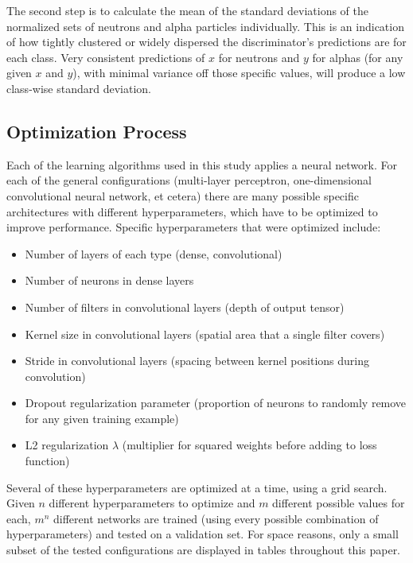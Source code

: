 \documentclass[10pt]{article}
\begin{document}
The second step is to calculate the mean of the standard deviations of the normalized sets of neutrons and alpha particles individually. This is an indication of how tightly clustered or widely dispersed the discriminator's predictions are for each class. Very consistent predictions of $x$ for neutrons and $y$ for alphas (for any given $x$ and $y$), with minimal variance off those specific values, will produce a low class-wise standard deviation.

\subsection{Optimization Process}

Each of the learning algorithms used in this study applies a neural network. For each of the general configurations (multi-layer perceptron, one-dimensional convolutional neural network, et cetera) there are many possible specific architectures with different hyperparameters, which have to be optimized to improve performance. Specific hyperparameters that were optimized include:

\begin{itemize}
    \item Number of layers of each type (dense, convolutional)
    \item Number of neurons in dense layers
    \item Number of filters in convolutional layers (depth of output tensor)
    \item Kernel size in convolutional layers (spatial area that a single filter covers)
    \item Stride in convolutional layers (spacing between kernel positions during convolution)
    \item Dropout regularization parameter (proportion of neurons to randomly remove for any given training example)
    \item L2 regularization $\lambda$ (multiplier for squared weights before adding to loss function)
\end{itemize}

Several of these hyperparameters are optimized at a time, using a grid search. Given $n$ different hyperparameters to optimize and $m$ different possible values for each, $m^n$ different networks are trained (using every possible combination of hyperparameters) and tested on a validation set. For space reasons, only a small subset of the tested configurations are displayed in tables throughout this paper.
\end{document}
